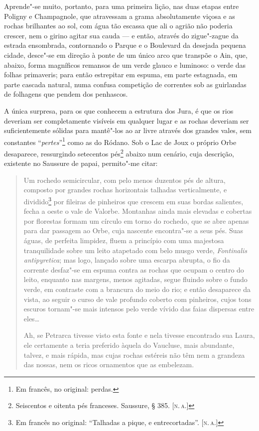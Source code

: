 Aprende"-se muito, portanto, para uma primeira lição, nas duas
etapas entre Poligny e Champagnole, que atravessam a grama absolutamente
viçosa e as rochas brilhantes ao sol, com água tão escassa que ali o
agrião não poderia crescer, nem o girino agitar sua cauda --- e então,
através do zigue"-zague da estrada ensombrada, contornando o Parque e o
Boulevard da desejada pequena cidade, desce"-se em direção à ponte de um
único arco que transpõe o Ain, que, abaixo, forma magníficos remansos de
um verde glauco e luminoso: o verde das folhas primaveris; para então
estrepitar em espuma, em parte estagnada, em parte cascada natural, numa
confusa competição de correntes sob as guirlandas de folhagens que
pendem dos penhascos.

A única surpresa, para os que conhecem a estrutura dos Jura, é que
os rios deveriam ser completamente visíveis em qualquer lugar e as
rochas deveriam ser suficientemente sólidas para mantê"-los ao ar livre
através dos grandes vales, sem constantes ``\textit{pertes}''\footnote{Em
  francês, no original: perdas.} como as do Ródano. Sob o
Lac de Joux o próprio Orbe desaparece, ressurgindo setecentos
pés\footnote{Seiscentos e oitenta pés franceses. Saussure, § 385. {[}\textsc{n.\,a.}{]}} abaixo num cenário, cuja descrição, existente no Saussure
de papai, permito"-me citar:

\begin{quote}
Um rochedo semicircular, com pelo menos duzentos pés de altura,
composto por grandes rochas horizontais talhadas verticalmente, e
dividido\footnote{Em francês no original: ``Talhadas a pique, e
  entrecortadas''. {[}\textsc{n.\,a.}{]}} por fileiras de pinheiros que crescem
em suas bordas salientes, fecha a oeste o vale de Valorbe. Montanhas
ainda mais elevadas e cobertas por florestas formam um círculo em torno
do rochedo, que se abre apenas para dar passagem ao Orbe, cuja nascente
encontra"-se a seus pés. Suas águas, de perfeita limpidez, fluem a
princípio com uma majestosa tranquilidade sobre um leito atapetado com
belo musgo verde, \textit{Fontinalis antipyretica}; mas logo, lançado
sobre uma escarpa abrupta, o fio da corrente desfaz"-se em espuma contra
as rochas que ocupam o centro do leito, enquanto nas margens, menos
agitadas, segue fluindo sobre o fundo verde, em contraste com a brancura
do meio do rio; e então desaparece da vista, ao seguir o curso de vale
profundo coberto com pinheiros, cujos tons escuros tornam"-se mais
intensos pelo verde vívido das faias dispersas entre eles\ldots{}

Ah, se Petrarca tivesse visto esta fonte e nela tivesse encontrado sua
Laura, ele certamente a teria preferido àquela do Vaucluse, mais
abundante, talvez, e mais rápida, mas cujas rochas estéreis não têm nem
a grandeza das nossas, nem os ricos ornamentos que as embelezam.
\end{quote}

